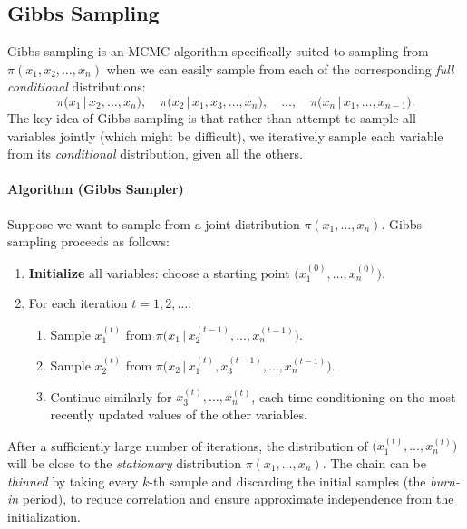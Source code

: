 \subsection{Gibbs Sampling}
Gibbs sampling is an MCMC algorithm specifically suited to sampling from \(\pi(x_1, x_2, \ldots, x_n)\) when we can easily sample from each of the corresponding \textit{full conditional} distributions:
\[
\pi\bigl(x_1 \,\big|\, x_2, \dots, x_n\bigr),\quad
\pi\bigl(x_2 \,\big|\, x_1, x_3, \dots, x_n\bigr),\quad \dots,\quad
\pi\bigl(x_n \,\big|\, x_1, \dots, x_{n-1}\bigr).
\]
The key idea of Gibbs sampling is that rather than attempt to sample all variables jointly (which might be difficult), we iteratively sample each variable from its \emph{conditional} distribution, given all the others. 

\paragraph{Algorithm (Gibbs Sampler)}
Suppose we want to sample from a joint distribution \(\pi(x_1, \ldots, x_n)\). Gibbs sampling proceeds as follows:

\begin{enumerate}
    \item \textbf{Initialize} all variables: choose a starting point \(\bigl(x_1^{(0)}, \dots, x_n^{(0)}\bigr)\).
    \item For each iteration \(t = 1, 2, \dots\):
    \begin{enumerate}
        \item Sample \( x_1^{(t)} \) from \(\pi\bigl(x_1 \,\big|\, x_2^{(t-1)}, \dots, x_n^{(t-1)}\bigr)\).
        \item Sample \( x_2^{(t)} \) from \(\pi\bigl(x_2 \,\big|\, x_1^{(t)}, x_3^{(t-1)}, \dots, x_n^{(t-1)}\bigr)\).
        \item Continue similarly for \( x_3^{(t)}, \dots, x_n^{(t)}\), each time conditioning on the most recently updated values of the other variables.
    \end{enumerate}
\end{enumerate}

After a sufficiently large number of iterations, the distribution of \(\bigl(x_1^{(t)}, \dots, x_n^{(t)}\bigr)\) will be close to the \textit{stationary} distribution \(\pi(x_1, \dots, x_n)\). The chain can be \emph{thinned} by taking every \(k\)-th sample and discarding the initial samples (the \emph{burn-in} period), to reduce correlation and ensure approximate independence from the initialization.

